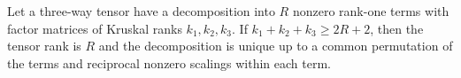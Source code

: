 Let a three-way tensor have a decomposition into \(R\) nonzero rank-one terms with factor matrices of Kruskal ranks \(k_1,k_2,k_3\). If \(k_1+k_2+k_3\ge 2R+2\), then the tensor rank is \(R\) and the decomposition is unique up to a common permutation of the terms and reciprocal nonzero scalings within each term.